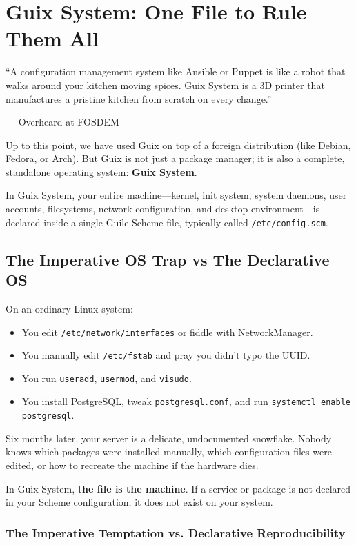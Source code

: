 \chapter{Guix System: One File to Rule Them All}
\label{chap:guix-system}

\epigraph{``A configuration management system like Ansible or Puppet is like a robot that walks around your kitchen moving spices. Guix System is a 3D printer that manufactures a pristine kitchen from scratch on every change.''}{--- Overheard at FOSDEM}

\noindent
Up to this point, we have used Guix on top of a foreign distribution (like Debian, Fedora, or Arch). But Guix is not just a package manager; it is also a complete, standalone operating system: \textbf{Guix System}.

In Guix System, your entire machine---kernel, init system, system daemons, user accounts, filesystems, network configuration, and desktop environment---is declared inside a single Guile Scheme file, typically called \texttt{/etc/config.scm}.

\section{The Imperative OS Trap vs The Declarative OS}

On an ordinary Linux system:
\begin{itemize}
  \item You edit \texttt{/etc/network/interfaces} or fiddle with NetworkManager.
  \item You manually edit \texttt{/etc/fstab} and pray you didn't typo the UUID.
  \item You run \texttt{useradd}, \texttt{usermod}, and \texttt{visudo}.
  \item You install PostgreSQL, tweak \texttt{postgresql.conf}, and run \texttt{systemctl enable postgresql}.
\end{itemize}

Six months later, your server is a delicate, undocumented snowflake. Nobody knows which packages were installed manually, which configuration files were edited, or how to recreate the machine if the hardware dies.

In Guix System, \textbf{the file is the machine}. If a service or package is not declared in your Scheme configuration, it does not exist on your system.

\subsection{The Imperative Temptation vs. Declarative Reproducibility}


